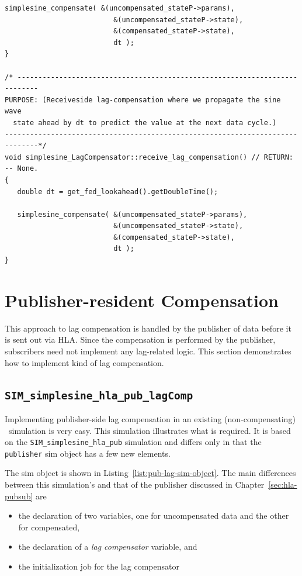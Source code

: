 \begin{lstlisting}[caption={The {\tt simplesine\_LagCompensation} class methods},label={list:simplesine-LagCompensation-methods}]
   simplesine_compensate( &(uncompensated_stateP->params),
                          &(uncompensated_stateP->state),
                          &(compensated_stateP->state),
                          dt );
}

/* ---------------------------------------------------------------------------
PURPOSE: (Receiveside lag-compensation where we propagate the sine wave
  state ahead by dt to predict the value at the next data cycle.)
------------------------------------------------------------------------------*/
void simplesine_LagCompensator::receive_lag_compensation() // RETURN: -- None.
{
   double dt = get_fed_lookahead().getDoubleTime();

   simplesine_compensate( &(uncompensated_stateP->params),
                          &(uncompensated_stateP->state),
                          &(compensated_stateP->state),
                          dt );
}
\end{lstlisting}


\section{Publisher-resident Compensation}

This approach to lag compensation is handled by the publisher of data before
it is sent out via HLA.
Since the compensation is performed by the publisher, subscribers need not
implement any lag-related logic.
This section demonstrates how to implement kind of lag compensation.

\subsection{{\tt SIM\_simplesine\_hla\_pub\_lagComp}}

Implementing publisher-side lag compensation in an existing (non-compensating)
\TrickHLA\ simulation is very easy.
This simulation illustrates what is required.
It is based on the {\tt SIM\_simplesine\_hla\_pub} simulation and differs
only in that the {\tt publisher} sim object has a few new elements.

The sim object is shown in Listing~\ref{list:pub-lag-sim-object}.
The main differences between this simulation's \sdefine and that of the
publisher discussed in Chapter~\ref{sec:hla-pubsub} are
\begin{itemize}
\item{
  the declaration of two \simplesine variables,
  one for uncompensated data and the other for compensated,
}
\item{
  the declaration of a {\em lag compensator} variable, and
}
\item{
  the initialization job for the lag compensator
}
\end{itemize}

